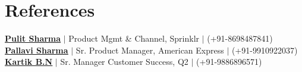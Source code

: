 \documentclass[a4paper,10pt]{article}
\begin{document}
\vspace{-6pt}
\section{References}
\begin{itemize}[leftmargin=0.15in, label={}]
  \small{\item{
    \href{https://linkedin.com/in/pulit-sharma-36426349}{\textbf{\underline{Pulit Sharma}}} $|$ Product Mgmt \& Channel, Sprinklr $|$ (+91-8698487841) \\
    \href{https://linkedin.com/in/pallavi-sharma-54088159}{\textbf{\underline{Pallavi Sharma}}} $|$ Sr. Product Manager, American Express $|$ (+91-9910922037) \\
    \href{https://linkedin.com/in/kartik-bn-3770807b}{\textbf{\underline{Kartik B.N}}} $|$ Sr. Manager Customer Success, Q2 $|$ (+91-9886896571)
  }}
\end{itemize}
\end{document}

